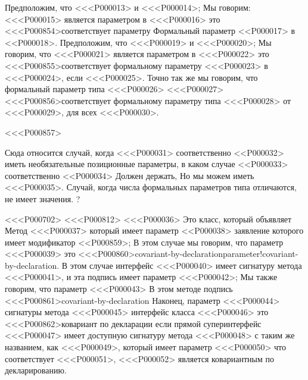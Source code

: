 %
Предположим, что <<<P000013> и <<<P000014>;
Мы говорим: <<<P000015> является параметром в <<<P000016> это
<<<P000854>{соответствует параметру}
Формальный параметр <<P000017> в <<P000018>.
Предположим, что <<<P000019> и <<<P000020>;
Мы говорим, что <<<P000021> является параметром в <<<P000022> это
<<<P000855>{соответствует} формальному параметру
<<<P000023> в <<<P000024>, если <<<P000025>.
%
Точно так же мы говорим, что формальный параметр типа
<<<P000026> <<<P000027>
<<<P000856>{соответствует} формальному параметру типа
<<<P000028> от <<<P000029>, для всех <<<P000030>.

<<<P000857>{%
Сюда относится случай, когда <<<P000031> соответственно <<P000032> иметь
необязательные позиционные параметры,
в каком случае <<P000033> соответственно <<P000034> Должен держать,
Но мы можем иметь <<<P000035>.
Случай, когда числа формальных параметров типа отличаются, не имеет значения.
?


<<<P000702>%
<<<P000812>%
<<<P000036> Это класс, который объявляет
Метод <<<P000037> который имеет
параметр <<P000038> заявление которого имеет модификатор <<P000859>;
В этом случае мы говорим, что параметр <<<P000039> это
<<<P000860>{covariant-by-declaration}{parameter!covariant-by-declaration}.
%
В этом случае интерфейс <<<P000040> имеет сигнатуру метода <<<P000041>,
и эта подпись имеет параметр <<<P000042>;
Мы также говорим, что параметр <<<P000043> В этом методе подпись
<<<P000861>{covariant-by-declaration}
%
Наконец, параметр <<<P000044> сигнатуры метода <<<P000045>
интерфейс класса <<<P000046> это
<<<P000862>{ковариант по декларации}
если прямой суперинтерфейс <<<P000047>
имеет доступную сигнатуру метода <<<P000048> с таким же названием, как <<<P000049>,
который имеет параметр <<<P000050> что соответствует <<<P000051>,
<<<P000052> является ковариантным по декларированию.

}
